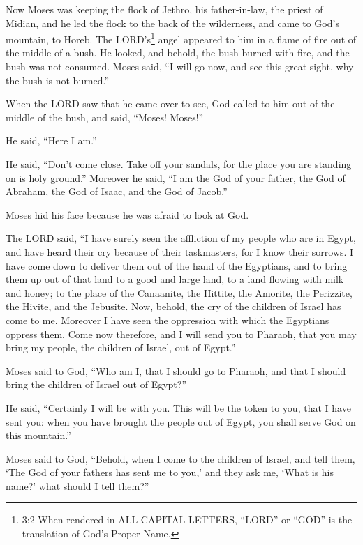 \mychapter{} \myverse*{}Now Moses was keeping the flock of Jethro, his father-in-law, the priest of Midian, and he led the flock to the back of the wilderness, and came to God’s mountain, to Horeb. \myverse{}The LORD’s\footnote{3:2 When rendered in ALL CAPITAL LETTERS, “LORD” or “GOD” is the translation of God’s Proper Name.} angel appeared to him in a flame of fire out of the middle of a bush. He looked, and behold, the bush burned with fire, and the bush was not consumed. \myverse{}Moses said, “I will go now, and see this great sight, why the bush is not burned.”


\myverse{}When the LORD saw that he came over to see, God called to him out
of the middle of the bush, and said, “Moses! Moses!”

He said, “Here I am.”


\myverse{}He said, “Don’t come close. Take off your sandals, for the place
you are standing on is holy ground.” \myverse{}Moreover he said, “I am the God of your father, the God of Abraham, the God of Isaac, and the God of Jacob.”

Moses hid his face because he was afraid to look at God.


\myverse{}The LORD said, “I have surely seen the affliction of my people
who are in Egypt, and have heard their cry because of their taskmasters, for I know their sorrows. \myverse{}I have come down to deliver them out of the hand of the Egyptians, and to bring them up out of that land to a good and large land, to a land flowing with milk and honey; to the place of the Canaanite, the Hittite, the Amorite, the Perizzite, the Hivite, and the Jebusite. \myverse{}Now, behold, the cry of the children of Israel has come to me. Moreover I have seen the oppression with which the Egyptians oppress them. \myverse{}Come now therefore, and I will send you to Pharaoh, that you may bring my people, the children of Israel, out of Egypt.”


\myverse{}Moses said to God, “Who am I, that I should go to Pharaoh, and
that I should bring the children of Israel out of Egypt?”


\myverse{}He said, “Certainly I will be with you. This will be the token
to you, that I have sent you: when you have brought the people out of Egypt, you shall serve God on this
mountain.”


\myverse{}Moses said to God, “Behold, when I come to the children of Israel,
and tell them, ‘The God of your fathers has sent me to you,’ and they ask me, ‘What is his name?’ what
should I tell them?”


